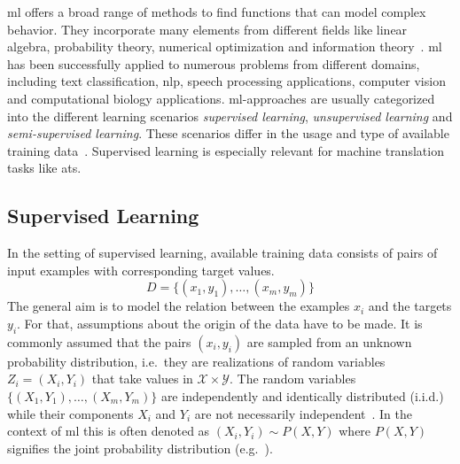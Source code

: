 \gls{ml} offers a broad range of methods to find functions that can model complex behavior.
They incorporate many elements from different fields like linear algebra, probability theory, numerical optimization and information theory~\autocite{Goodfellow-et-al-2016}.
\gls{ml} has been successfully applied to numerous problems from different domains, including text classification, \gls{nlp}, speech processing applications, computer vision and computational biology applications.
\gls{ml}-approaches are usually categorized into the different learning scenarios \textit{supervised learning}, \textit{unsupervised learning} and \textit{semi-supervised learning}.
These scenarios differ in the usage and type of available training data~\autocite{mohri2018foundations}.
Supervised learning is especially relevant for machine translation tasks like \gls{ats}.

\subsection{Supervised Learning}\label{subsec:supervised-learning}
In the setting of supervised learning, available training data consists of pairs of input examples with corresponding target values.
\[
    D = \{(x_1, y_1), \dots, (x_m, y_m)\}
\]
The general aim is to model the relation between the examples $x_i$ and the targets $y_i$.
For that, assumptions about the origin of the data have to be made.
It is commonly assumed that the pairs $(x_i, y_i)$ are sampled from an unknown probability distribution, i.e.\ they are realizations of random variables $Z_i = (X_i, Y_i)$ that take values in $\mathcal{X} \times \mathcal{Y}$.
The random variables $\{(X_1, Y_1), \dots ,(X_m, Y_m)\}$ are independently and identically distributed (i.i.d.) while their components $X_i$ and $Y_i$ are not necessarily independent~\autocite{gressmann2019probabilistic}.
In the context of \gls{ml} this is often denoted as $(X_i,Y_i) \sim P(X, Y)$ where $P(X, Y)$ signifies the joint probability distribution (e.g.\ \textcite{Goodfellow-et-al-2016}).

